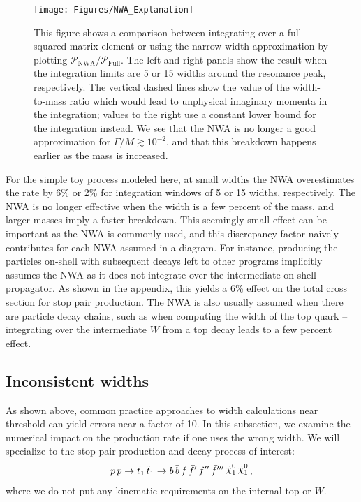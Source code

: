 \documentclass[a4paper,12pt]{article}
\def\stopone{\ensuremath{\mathchoice%
      {\displaystyle\raise.0ex\hbox{$\displaystyle\tilde t_1$}}%
         {\textstyle\raise-.2ex\hbox{$\textstyle\tilde t_1$}}%
       {\scriptstyle\raise.0ex\hbox{$\scriptstyle\tilde t_1$}}%
 {\scriptscriptstyle\raise.0ex\hbox{$\scriptscriptstyle\tilde t_1$}}}}
\def\ninoone{\ensuremath{\mathchoice%
      {\displaystyle\raise.4ex\hbox{$\displaystyle\tilde\chi^0_1$}}%
         {\textstyle\raise.1ex\hbox{$\textstyle\tilde\chi^0_1$}}%
       {\scriptstyle\raise.3ex\hbox{$\scriptstyle\tilde\chi^0_1$}}%
 {\scriptscriptstyle\raise.3ex\hbox{$\scriptscriptstyle\tilde\chi^0_1$}}}}
\begin{document}
\begin{figure}[t]
\begin{center}
\texttt{[image: Figures/NWA\_Explanation]}
\caption{This figure shows a comparison between integrating over a full squared matrix element or using the narrow width approximation by plotting $\mathcal{P}_\text{NWA}/\mathcal{P}_\text{Full}$. The left and right panels show the result when the integration limits are 5 or 15 widths around the resonance peak, respectively. The vertical dashed lines show the value of the width-to-mass ratio which would lead to unphysical imaginary momenta in the integration; values to the right use a constant lower bound for the integration instead.  We see that the NWA is no longer a good approximation for $\Gamma / M\gtrsim 10^{-2}$, and that this breakdown happens earlier as the mass is increased.}
\label{fig:NWAimpact}
\end{center}
\end{figure}

For the simple toy process modeled here, at small widths the NWA overestimates the rate by 6\% or 2\% for integration windows of 5 or 15 widths, respectively. The NWA is no longer effective when the width is a few percent of the mass, and larger masses imply a faster breakdown.  This seemingly small effect can be important as the NWA is commonly used, and this discrepancy factor naively contributes for each NWA assumed in a diagram. For instance, producing the particles on-shell with subsequent decays left to other programs implicitly assumes the NWA as it does not integrate over the intermediate on-shell propagator. As shown in the appendix, this yields a 6\% effect on the total cross section for stop pair production. The NWA is also usually assumed when there are particle decay chains, such as when computing the width of the top quark -- integrating over the intermediate $W$ from a top decay leads to a few percent effect.

\subsection{Inconsistent widths}
\label{sec:WrongWidths}
As shown above, common practice approaches to width calculations near threshold can yield errors near a factor of 10. In this subsection, we examine the numerical impact on the production rate if one uses the wrong width. We will specialize to the stop pair production and decay process of interest:
\begin{align}
p\,p \rightarrow \stopone\,\stopone \rightarrow b\,\bar{b}\,f\,\bar{f}'\, f''\, \bar{f}'''\,\ninoone\,\ninoone\,,
\end{align}
where we do not put any kinematic requirements on the internal top or $W$.  
\end{document}
